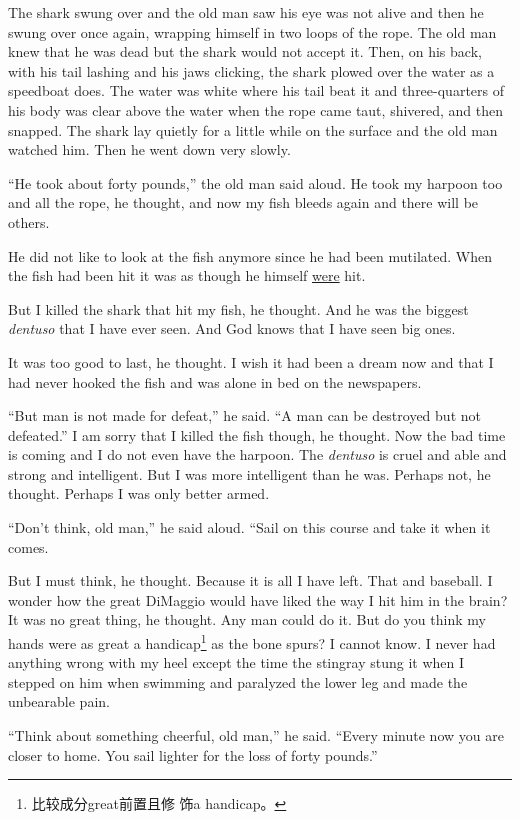 \documentclass[fontset=ubuntu,zihao=-4]{ctexrep}
\begin{document}
The shark swung over and the old man saw his eye was not alive and then he
swung over once again, wrapping himself in two loops of the rope. The old
man knew that he was dead but the shark would not accept it. Then, on his
back, with his tail lashing and his jaws clicking, the shark \gls{plowed}
over the water as a \gls{speedboat} does. The water was white where his tail
beat it and three-\glspl{quarter} of his body was clear above the water when the
rope came taut, \gls{shivered}, and then \gls{snapped}. The shark lay
quietly for a little while on the surface and the old man watched him. Then
he went down very slowly.

``He took about forty pounds,'' the old man said aloud. He took my harpoon
too and all the rope, he thought, and now my fish bleeds again and there
will be others.

He did not like to look at the fish anymore since he had been
\gls{mutilated}. When the fish had been hit it was as though he himself
\uline{were} hit.

But I killed the shark that hit my fish, he thought. And he was the biggest
\emph{dentuso} that I have ever seen. And God knows that I have seen big ones.

It was too good to last, he thought. I wish it had been a dream now and
that I had never hooked the fish and was alone in bed on the newspapers.

``But man is not made for defeat,'' he said. ``A man can be destroyed but
not defeated.'' I am sorry that I killed the fish though, he thought. Now
the bad time is coming and I do not even have the harpoon. The \emph{dentuso} is
cruel and able and strong and intelligent. But I was more intelligent than
he was. Perhaps not, he thought. Perhaps I was only better armed.

``Don't think, old man,'' he said aloud. ``Sail on this course and take it
when it comes.

But I must think, he thought. Because it is all I have left. That and
baseball. I wonder how the great DiMaggio would have liked the way I hit him
in the brain? It was no great thing, he thought. Any man could do it. But do
you think my hands were as great a handicap\footnote{比较成分great前置且修
  饰a handicap。} as the bone spurs? I cannot know. I never had anything
wrong with my heel except the time the \gls{stingray} \gls{stung} it when I
stepped on him when swimming and \gls{paralyzed} the lower leg and made the
\gls{unbearable} pain.

``Think about something cheerful, old man,'' he said. ``Every minute now you
are closer to home. You sail lighter for the loss of forty pounds.''
\end{document}
